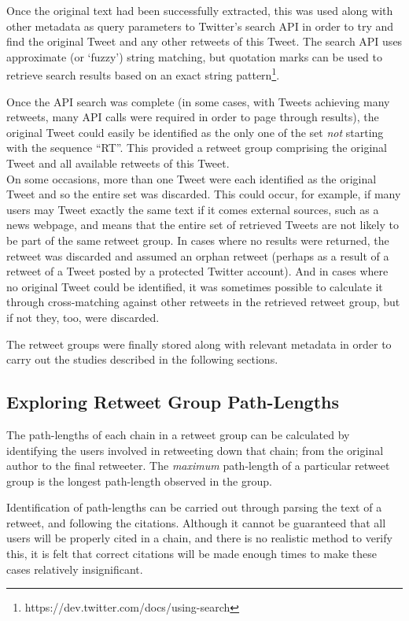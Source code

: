 Once the original text had been successfully extracted, this was used along with other metadata as query parameters to Twitter's search API in order to try and find the original Tweet and any other retweets of this Tweet. The search API uses approximate (or `fuzzy') string matching, but quotation marks can be used to retrieve search results based on an exact string pattern\footnote{https://dev.twitter.com/docs/using-search}.

Once the API search was complete (in some cases, with Tweets achieving many retweets, many API calls were required in order to page through results), the original Tweet could easily be identified as the only one of the set \textit{not} starting with the sequence ``RT''. This provided a retweet group comprising the original Tweet and all available retweets of this Tweet.\\
On some occasions, more than one Tweet were each identified as the original Tweet and so the entire set was discarded. This could occur, for example, if many users may Tweet exactly the same text if it comes external sources, such as a news webpage, and means that the entire set of retrieved Tweets are not likely to be part of the same retweet group.
In cases where no results were returned, the retweet was discarded and assumed an orphan retweet (perhaps as a result of a retweet of a Tweet posted by a protected Twitter account). And in cases where no original Tweet could be identified, it was sometimes possible to calculate it through cross-matching against other retweets in the retrieved retweet group, but if not they, too, were discarded.

The retweet groups were finally stored along with relevant metadata in order to carry out the studies described in the following sections.


\subsection{Exploring Retweet Group Path-Lengths}
The path-lengths of each chain in a retweet group can be calculated by identifying the users involved in retweeting down that chain; from the original author to the final retweeter. The \textit{maximum} path-length of a particular retweet group is the longest path-length observed in the group.

Identification of path-lengths can be carried out through parsing the text of a retweet, and following the citations. Although it cannot be guaranteed that all users will be properly cited in a chain, and there is no realistic method to verify this, it is felt that correct citations will be made enough times to make these cases relatively insignificant.

